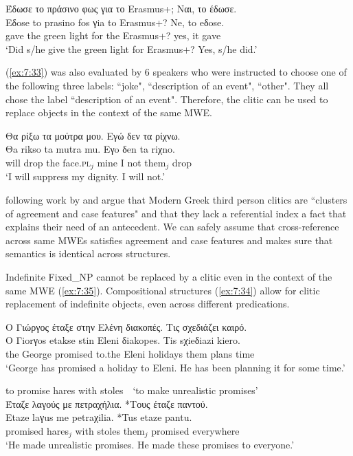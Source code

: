 \documentclass[output=paper]{langsci/langscibook}
\begin{document}
\ea%
\label{ex:7:32}
\glll Έδωσε το πράσινο φως για το Erasmus+; Ναι, το έδωσε.\\
Eδose to prasino fos γia to Erasmus+? Ne, to eδose.\\
 gave  the  green light for the Erasmus+? yes, it gave\\
\glt `Did s/he give the green light for Erasmus+? Yes, s/he did.’
\z

(\ref{ex:7:33}) was also evaluated by 6  speakers who were instructed to choose one of the following three labels: ``joke", ``description of an event", ``other". They all chose the label ``description of an event". Therefore, the clitic   can be used to replace objects in the context of the same MWE.

\ea%
    \label{ex:7:33}
\glll Θα ρίξω τα μούτρα μου. Εγώ δεν τα ρίχνω.\\
Θa rikso ta mutra mu. Eγo δen ta riχno. \\
     will drop the face.\textsc{pl}$_j$ mine I not them$_j$ drop\\
\glt `I will suppress my dignity. I will not.’
\z

\citet{tsimpli2007} following work by \citet{cardinaletti1999} and \citet{stavrakaki1999} argue that Modern Greek third person clitics are ``clusters of agreement and case features" and that they lack a referential index \textendash a fact that explains their need of an  antecedent.  We can safely assume that cross-reference across same MWEs satisfies agreement and case features and makes sure that semantics is identical across structures.  

Indefinite Fixed\_NP cannot be replaced by a clitic even in the context of the same MWE (\ref{ex:7:35}). Compositional structures (\ref{ex:7:34}) allow for clitic replacement of indefinite objects, even across different predications.

\ea%
\label{ex:7:34}
\glll Ο Γιώργος έταξε στην Ελένη διακοπές. Τις σχεδιάζει καιρό.\\
O Γiorγos etakse stin Eleni δiakopes. Tis sχieδiazi kiero. \\
 the George promised to.the Eleni holidays them plans time \\
\glt `George has promised a holiday to Eleni. He has been planning it for some time.’
\z

\ea%
\label{ex:7:35}
to promise hares with stoles~~`to make unrealistic promises'\\
\glll Έταζε λαγούς με πετραχήλια. *Τους έταζε παντού. \\
 Etaze laγus me petraχilia. *Tus etaze pantu.\\
  promised  hares$_j$ with stoles them$_j$ promised everywhere\\
\glt `He made unrealistic promises. He made these promises to everyone.’
\z
\end{document}
